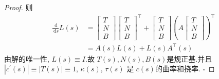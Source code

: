 \documentclass[../../古典微分几何.tex]{subfiles}
\begin{document}
\begin{proof}
    则 \[
    \begin{aligned}
    \frac{\,\mathrm{d}  }{\,\mathrm{d} s }L\left( s \right) &=  \begin{bmatrix} 
        T\\ 
         N\\ 
          B 
    \end{bmatrix} \begin{bmatrix} 
        T\\ 
         N\\ 
          B 
    \end{bmatrix}^{\top}     + \begin{bmatrix} 
        T\\ 
         N\\ 
          B 
    \end{bmatrix} \left( A \begin{bmatrix} 
        T\\ 
         N\\ 
          B 
    \end{bmatrix}  \right)  ^{\top}\\ 
     &=  A\left( s \right)L\left( s \right)+ L\left( s \right)   A^{\top}\left( s \right) 
    \end{aligned}
    \]由解的唯一性, \(  L\left( s \right)\equiv I   \).故 \(  T\left( s \right),N\left( s \right),B\left( s \right)     \)是规正基.并且 \(  \left| c^{\prime} \left( s \right)  \right|\equiv \left| T\left( s \right)  \right|\equiv 1    \), \(   \kappa \left( s \right)   \), \(  \tau \left( s \right)   \)     是 \(  c\left( s \right)   \)的曲率和挠率. 
    \hfill $\square$
\end{proof}
\end{document}
